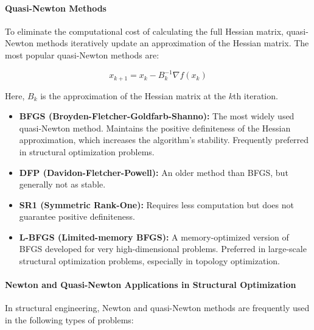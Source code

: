 \paragraph{Quasi-Newton Methods}
To eliminate the computational cost of calculating the full Hessian matrix, quasi-Newton methods iteratively update an approximation of the Hessian matrix. The most popular quasi-Newton methods are:

\begin{equation}
x_{k+1} = x_k - B_k^{-1} \nabla f(x_k)
\end{equation}

Here, $B_k$ is the approximation of the Hessian matrix at the $k$th iteration.

\begin{tcolorbox}[title=Basic Quasi-Newton Algorithms]
\begin{itemize}
    \item \textbf{BFGS (Broyden-Fletcher-Goldfarb-Shanno):} The most widely used quasi-Newton method. Maintains the positive definiteness of the Hessian approximation, which increases the algorithm's stability. Frequently preferred in structural optimization problems.
    
    \item \textbf{DFP (Davidon-Fletcher-Powell):} An older method than BFGS, but generally not as stable.
    
    \item \textbf{SR1 (Symmetric Rank-One):} Requires less computation but does not guarantee positive definiteness.
    
    \item \textbf{L-BFGS (Limited-memory BFGS):} A memory-optimized version of BFGS developed for very high-dimensional problems. Preferred in large-scale structural optimization problems, especially in topology optimization.
\end{itemize}
\end{tcolorbox}

\paragraph{Newton and Quasi-Newton Applications in Structural Optimization}
In structural engineering, Newton and quasi-Newton methods are frequently used in the following types of problems:

